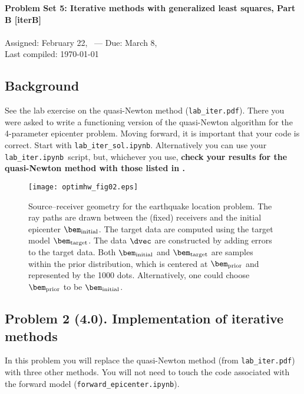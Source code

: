 \documentclass[11pt,titlepage,fleqn]{article}
\newcommand{\tfile}{{\tt lab\_iter.ipynb}}
\newcommand{\tfileFE}{{\tt forward\_epicenter.ipynb}}
\begin{document}
 

\begin{spacing}{1.2}
\centering
{\large \bf Problem Set 5: Iterative methods with generalized least squares, Part B [iterB]} \\
\cltag\ \\
Assigned: February 22, \cyear\ --- Due: March 8, \cyear\ \\
Last compiled: \today
\end{spacing}


\subsection*{Background}

See the lab exercise on the quasi-Newton method (\verb+lab_iter.pdf+). There you were asked to write a functioning version of the quasi-Newton algorithm for the 4-parameter epicenter problem. Moving forward, it is important that your code is correct. Start with \verb+lab_iter_sol.ipynb+.
%
Alternatively you can use your \tfile\ script, but, whichever you use, {\bf check your results for the quasi-Newton method with those listed in .}

\vspace{0.5cm}
\begin{figure}[h]
\centering
\texttt{[image: optimhw\_fig02.eps]}
\caption[Source-receiver geometry]
{{
Source--receiver geometry for the earthquake location problem. The ray paths are drawn between the (fixed) receivers and the initial epicenter $\bem_{\rm initial}$.
The target data are computed using the target model \textcolor{red}{$\bem_{\rm target}$}.
The data $\dvec$ are constructed by adding errors to the target data.
Both $\bem_{\rm initial}$ and $\bem_{\rm target}$ are samples within the prior distribution, which is centered at \textcolor{blue}{$\bem_{\rm prior}$} and represented by the 1000 dots. Alternatively, one could choose \textcolor{blue}{$\bem_{\rm prior}$} to be $\bem_{\rm initial}$.
\label{fig:srcrec}
}}
\end{figure}

\clearpage\pagebreak
\subsection*{Problem 2 (4.0). Implementation of iterative methods}

In this problem you will replace the quasi-Newton method (from \verb+lab_iter.pdf+) with three other methods. You will not need to touch the code associated with the forward model (\tfileFE).
\end{document}
